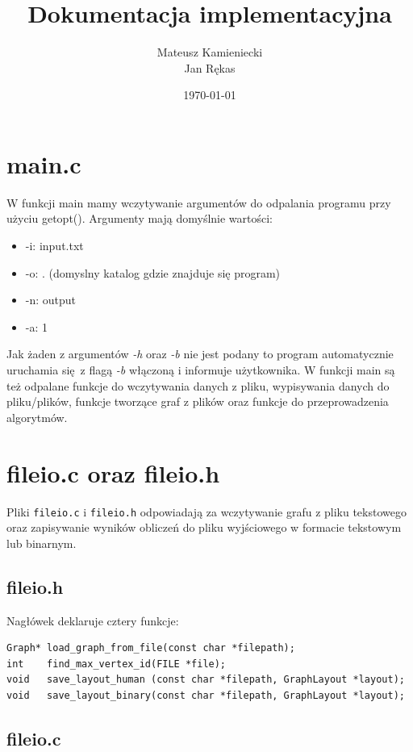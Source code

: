 \documentclass[12pt]{article}
\title{Dokumentacja implementacyjna}
\author{Mateusz Kamieniecki \\ Jan Rękas}
\date{\today}
\begin{document}
\maketitle

\tableofcontents

\section{main.c}
W funkcji main mamy wczytywanie argumentów do odpalania programu przy użyciu
getopt(). Argumenty mają domyślnie wartości:
\begin{itemize}
	\item -i: input.txt
	\item -o: . (domyslny katalog gdzie znajduje się program)
	\item -n: output
	\item -a: 1
\end{itemize}
Jak żaden z argumentów \textit{-h} oraz \textit{-b} nie jest podany to program
automatycznie uruchamia się z flagą \textit{-b} włączoną i informuje użytkownika. W
funkcji main są też odpalane funkcje do wczytywania danych z pliku, wypisywania
danych do pliku/plików, funkcje tworzące graf z plików oraz funkcje do
przeprowadzenia algorytmów.

\section{fileio.c oraz fileio.h}

Pliki \texttt{fileio.c} i \texttt{fileio.h} odpowiadają za wczytywanie grafu z pliku tekstowego
oraz zapisywanie wyników obliczeń do pliku wyjściowego w formacie tekstowym lub binarnym.

\subsection{fileio.h}

Nagłówek deklaruje cztery funkcje:

\begin{lstlisting}
Graph* load_graph_from_file(const char *filepath);
int    find_max_vertex_id(FILE *file);
void   save_layout_human (const char *filepath, GraphLayout *layout);
void   save_layout_binary(const char *filepath, GraphLayout *layout);
\end{lstlisting}

\subsection{fileio.c}
\end{document}
